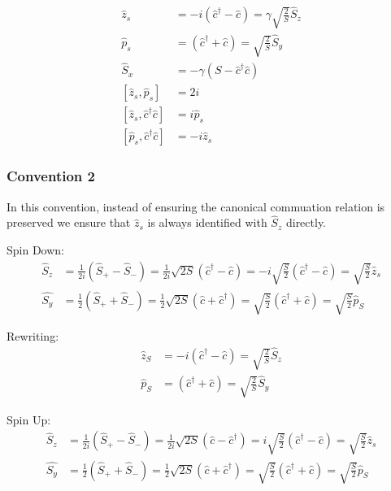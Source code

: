 \documentclass[12pt]{article}
\begin{document}
\begin{align}
\hat{z}_s &= - i (\hat{c}^{\dag}-\hat{c}) = \gamma\sqrt{\frac{2}{S}} \hat{S}_z \\
\hat{p}_s &= (\hat{c}^{\dag} + \hat{c}) = \sqrt{\frac{2}{S}} \hat{S}_y \\
\hat{S}_x &= -\gamma(S-\hat{c}^{\dag}\hat{c})\\
[\hat{z}_s,\hat{p}_s] &= 2i\\
[\hat{z}_s,\hat{c}^{\dag}\hat{c}] &= i \hat{p}_s\\
[\hat{p}_s,\hat{c}^{\dag}\hat{c}] &= -i \hat{z}_s
\end{align}

\subsubsection{Convention 2}
In this convention, instead of ensuring the canonical commuation relation is preserved we ensure that $\hat{z}_s$ is always identified with $\hat{S}_z$ directly.

Spin Down:
\begin{align}
\hat{S}_z &= \frac{1}{2i}\left(\hat{S}_+-\hat{S}_-\right) = \frac{1}{2i}\sqrt{2S}(\hat{c}^{\dag}-\hat{c}) = -i\sqrt{\frac{S}{2}}(\hat{c}^{\dag}-\hat{c}) = \sqrt{\frac{S}{2}}\hat{z}_s\\
\hat{S_y} &= \frac{1}{2} \left( \hat{S}_+ + \hat{S}_- \right) = \frac{1}{2} \sqrt{2S} \left( \hat{c} + \hat{c}^{\dag} \right) =  \sqrt{\frac{S}{2}} \left(\hat{c}^{\dag} + \hat{c}\right) = \sqrt{\frac{S}{2}} \hat{p}_S
\end{align}

Rewriting:
\begin{align}
\hat{z}_S &= -i(\hat{c}^{\dag} - \hat{c}) = \sqrt{\frac{2}{S}} \hat{S}_z \\
\hat{p}_S &= (\hat{c}^{\dag} + \hat{c}) = \sqrt{\frac{2}{S}} \hat{S}_y 
\end{align}

Spin Up:
\begin{align}
\hat{S}_z &= \frac{1}{2i}\left(\hat{S}_+-\hat{S}_-\right) = \frac{1}{2i}\sqrt{2S}(\hat{c}-\hat{c}^{\dag}) = i\sqrt{\frac{S}{2}}(\hat{c}^{\dag}-\hat{c}) = \sqrt{\frac{S}{2}}\hat{z}_s\\
\hat{S_y} &= \frac{1}{2} \left( \hat{S}_+ + \hat{S}_- \right) = \frac{1}{2} \sqrt{2S} \left( \hat{c} + \hat{c}^{\dag} \right) =  \sqrt{\frac{S}{2}} \left(\hat{c}^{\dag} + \hat{c}\right) = \sqrt{\frac{S}{2}} \hat{p}_S
\end{align}
\end{document}
